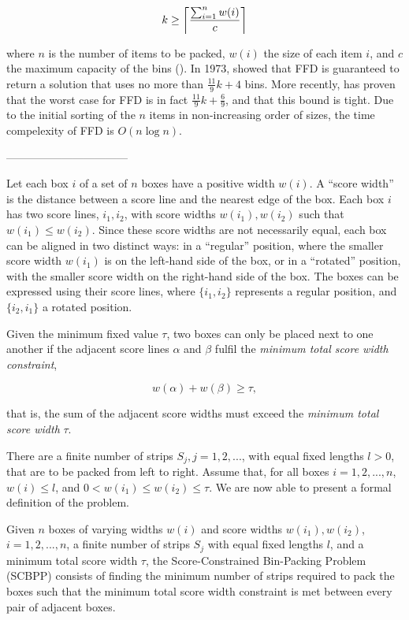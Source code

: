 \documentclass[oribibl]{llncs}
\begin{document}
\begin{equation*}
	k \geq \ceil*{\frac{\sum_{i=1}^{n}w(i)}{c}}
\end{equation*}

where $n$ is the number of items to be packed, $w(i)$ the size of each item $i$, and $c$ the maximum capacity of the bins (\citealp{martello1990b}). In 1973, \citeauthor{johnson1973} showed that FFD is guaranteed to return a solution that uses no more than $\frac{11}{9}k + 4$ bins. More recently, \cite{dosa2007} has proven that the worst case for FFD is in fact $\frac{11}{9}k + \frac{6}{9}$, and that this bound is tight. Due to the initial sorting of the $n$ items in non-increasing order of sizes, the time compelexity of FFD is $O(n\log n)$.

---------------------------------

Let each box $i$ of a set of $n$ boxes have a positive width $w(i)$. A ``score width'' is the distance between a score line and the nearest edge of the box. Each box $i$ has two score lines, $i_1, i_2$, with score widths $w(i_1), w(i_2)$ such that $w(i_1) \leq w(i_2)$. Since these score widths are not necessarily equal, each box can be aligned in two distinct ways: in a ``regular'' position, where the smaller score width $w(i_1)$ is on the left-hand side of the box, or in a ``rotated'' position, with the smaller score width on the right-hand side of the box. The boxes can be expressed using their score lines, where $\{i_1, i_2\}$ represents a regular position, and $\{i_2, i_1\}$ a rotated position. 

Given the minimum fixed value $\tau$, two boxes can only be placed next to one another if the adjacent score lines $\alpha$ and $\beta$ fulfil the \textit{minimum total score width constraint},

\begin{equation*}
	\label{eqn:mtswc}
	w(\alpha) + w(\beta) \geq \tau,
\end{equation*}

that is, the sum of the adjacent score widths must exceed the \textit{minimum total score width} $\tau$.

There are a finite number of strips $S_j, j = 1, 2, ...$, with equal fixed lengths $l > 0$, that are to be packed from left to right. Assume that, for all boxes $i = 1, 2, ..., n$, $w(i) \leq l$, and $0 < w(i_1) \leq w(i_2) \leq \tau$. We are now able to present a formal definition of the problem.

\begin{definition}
	\label{defn:scbpp}
	Given $n$ boxes of varying widths $w(i)$ and score widths $w(i_1), w(i_2)$, $i = 1, 2, ..., n$, a finite number of strips $S_j$ with equal fixed lengths $l$, and a minimum total score width $\tau$, the Score-Constrained Bin-Packing Problem (SCBPP) consists of finding the minimum number of strips required to pack the boxes such that the minimum total score width constraint is met between every pair of adjacent boxes. 
\end{definition}
\end{document}
